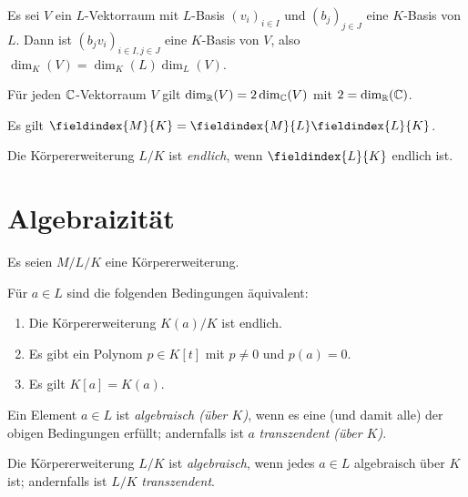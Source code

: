 \begin{lemma}
  Es sei $V$ ein $L$-Vektorraum mit $L$-Basis $(v_i)_{i \in I}$ und $(b_j)_{j \in J}$ eine $K$-Basis von $L$.
  Dann ist $(b_j v_i)_{i \in I, j \in J}$ eine $K$-Basis von $V$, also $\dim_K(V) = \dim_K(L) \dim_L(V)$.
\end{lemma}

\begin{example}
  Für jeden $\mathbb{C}$-Vektorraum $V$ gilt $\dim_{\mathbb{R}}(V) = 2 \dim_{\mathbb{C}}(V)$ mit $2 = \dim_{\mathbb{R}}(\mathbb{C})$.
\end{example}

\begin{corollary}
  Es gilt $\fieldindex{M}{K} = \fieldindex{M}{L} \fieldindex{L}{K}$.
\end{corollary}

\begin{definition}
  Die Körpererweiterung $L/K$ ist \emph{endlich}, wenn $\fieldindex{L}{K}$ endlich ist.
\end{definition}





\section{Algebraizität}

Es seien $M/L/K$ eine Körpererweiterung.

\begin{lemma}
  Für $a \in L$ sind die folgenden Bedingungen äquivalent:
  \begin{enumerate}
    \item
      Die Körpererweiterung $K(a)/K$ ist endlich.
    \item
      Es gibt ein Polynom $p \in K[t]$ mit $p \neq 0$ und $p(a) = 0$.
    \item
      Es gilt $K[a] = K(a)$.
  \end{enumerate}
\end{lemma}

\begin{definition}
  Ein Element $a \in L$ ist \emph{algebraisch \textup(über $K$\textup)}, wenn es eine \textup(und damit alle\textup) der obigen Bedingungen erfüllt;
  andernfalls ist $a$ \emph{transzendent \textup(über $K$\textup)}.
  
  Die Körpererweiterung $L/K$ ist \emph{algebraisch}, wenn jedes $a \in L$ algebraisch über $K$ ist;
  andernfalls ist $L/K$ \emph{transzendent}.
\end{definition}

